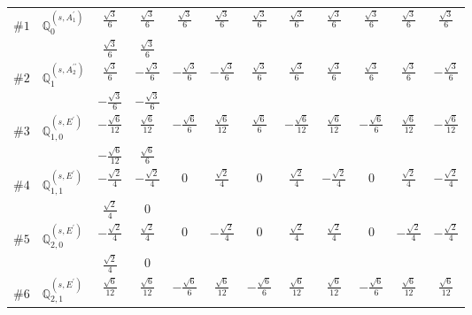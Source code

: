 \documentclass[fleqn,9pt,landscape]{jsarticle}
\begin{document}
\begin{center}
\begin{longtable}{lcccccccccc}
$ \#1\quad \mathbb{Q}_{0}^{(s,A_{1}^{\prime})} $ & $ \frac{\sqrt{3}}{6} $ & $ \frac{\sqrt{3}}{6} $ & $ \frac{\sqrt{3}}{6} $ & $ \frac{\sqrt{3}}{6} $ & $ \frac{\sqrt{3}}{6} $ & $ \frac{\sqrt{3}}{6} $ & $ \frac{\sqrt{3}}{6} $ & $ \frac{\sqrt{3}}{6} $ & $ \frac{\sqrt{3}}{6} $ & $ \frac{\sqrt{3}}{6} $ \\
& $ \frac{\sqrt{3}}{6} $ & $ \frac{\sqrt{3}}{6} $ & $  $ & $  $ & $  $ & $  $ & $  $ & $  $ & $  $ & $  $ \\ \hline
$ \#2\quad \mathbb{Q}_{1}^{(s,A_{2}^{\prime\prime})} $ & $ \frac{\sqrt{3}}{6} $ & $ - \frac{\sqrt{3}}{6} $ & $ - \frac{\sqrt{3}}{6} $ & $ - \frac{\sqrt{3}}{6} $ & $ \frac{\sqrt{3}}{6} $ & $ \frac{\sqrt{3}}{6} $ & $ \frac{\sqrt{3}}{6} $ & $ \frac{\sqrt{3}}{6} $ & $ \frac{\sqrt{3}}{6} $ & $ - \frac{\sqrt{3}}{6} $ \\
& $ - \frac{\sqrt{3}}{6} $ & $ - \frac{\sqrt{3}}{6} $ & $  $ & $  $ & $  $ & $  $ & $  $ & $  $ & $  $ & $  $ \\ \hline
$ \#3\quad \mathbb{Q}_{1,0}^{(s,E^{\prime})} $ & $ - \frac{\sqrt{6}}{12} $ & $ \frac{\sqrt{6}}{12} $ & $ - \frac{\sqrt{6}}{6} $ & $ \frac{\sqrt{6}}{12} $ & $ \frac{\sqrt{6}}{6} $ & $ - \frac{\sqrt{6}}{12} $ & $ \frac{\sqrt{6}}{12} $ & $ - \frac{\sqrt{6}}{6} $ & $ \frac{\sqrt{6}}{12} $ & $ - \frac{\sqrt{6}}{12} $ \\
& $ - \frac{\sqrt{6}}{12} $ & $ \frac{\sqrt{6}}{6} $ & $  $ & $  $ & $  $ & $  $ & $  $ & $  $ & $  $ & $  $ \\ \hline
$ \#4\quad \mathbb{Q}_{1,1}^{(s,E^{\prime})} $ & $ - \frac{\sqrt{2}}{4} $ & $ - \frac{\sqrt{2}}{4} $ & $ 0 $ & $ \frac{\sqrt{2}}{4} $ & $ 0 $ & $ \frac{\sqrt{2}}{4} $ & $ - \frac{\sqrt{2}}{4} $ & $ 0 $ & $ \frac{\sqrt{2}}{4} $ & $ - \frac{\sqrt{2}}{4} $ \\
& $ \frac{\sqrt{2}}{4} $ & $ 0 $ & $  $ & $  $ & $  $ & $  $ & $  $ & $  $ & $  $ & $  $ \\ \hline
$ \#5\quad \mathbb{Q}_{2,0}^{(s,E^{\prime})} $ & $ - \frac{\sqrt{2}}{4} $ & $ \frac{\sqrt{2}}{4} $ & $ 0 $ & $ - \frac{\sqrt{2}}{4} $ & $ 0 $ & $ \frac{\sqrt{2}}{4} $ & $ \frac{\sqrt{2}}{4} $ & $ 0 $ & $ - \frac{\sqrt{2}}{4} $ & $ - \frac{\sqrt{2}}{4} $ \\
& $ \frac{\sqrt{2}}{4} $ & $ 0 $ & $  $ & $  $ & $  $ & $  $ & $  $ & $  $ & $  $ & $  $ \\ \hline
$ \#6\quad \mathbb{Q}_{2,1}^{(s,E^{\prime})} $ & $ \frac{\sqrt{6}}{12} $ & $ \frac{\sqrt{6}}{12} $ & $ - \frac{\sqrt{6}}{6} $ & $ \frac{\sqrt{6}}{12} $ & $ - \frac{\sqrt{6}}{6} $ & $ \frac{\sqrt{6}}{12} $ & $ \frac{\sqrt{6}}{12} $ & $ - \frac{\sqrt{6}}{6} $ & $ \frac{\sqrt{6}}{12} $ & $ \frac{\sqrt{6}}{12} $ \\

\end{longtable}
\end{center}
\end{document}
